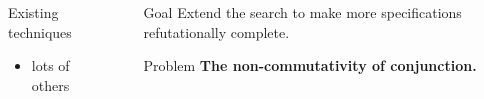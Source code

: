 \documentclass[final,20pt]{beamer}
\begin{document}
\begin{frame}[t]
\begin{columns}[t]
\begin{column}{\onecolwid}
\begin{block}{Existing techniques}
\begin{itemize}
\begin{exampleblock}{\centering Binary Division with reminder}
        \bigskip
            
        \bigskip
        
        to a sophisticated recursive solution~\cite{Kiselyov:2008:PDC:1788446.1788456} of 20 LOC.
      \end{exampleblock}
		
		\item lots of others
	\end{itemize}
       
    \end{block}
    
   
    
  
  \end{column}

  \begin{column}{\sepwid}\end{column} %

  \begin{column}{\onecolwid} %
  
  
       \begin{alertblock}{Goal}
         Extend the search to make more specifications refutationally complete.
       \end{alertblock}
  
    \vskip8mm
    
    \begin{block}{Problem}
      \vskip8mm
      {\large \textbf{The non-commutativity of conjunction. }}
      
      

\end{block}
\end{column}
\end{columns}
\end{frame}
\end{document}
